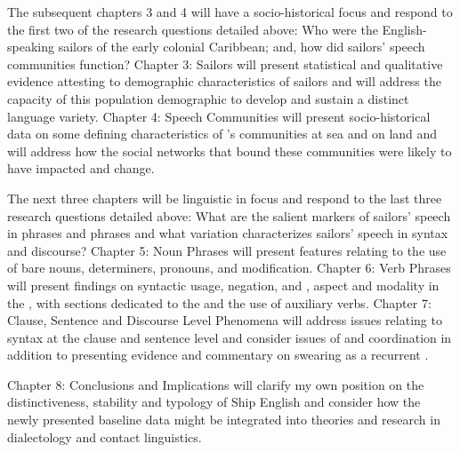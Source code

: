   The subsequent chapters 3 and 4 will have a socio-historical focus and respond to the first two of the research questions detailed above: Who were the English-speaking sailors of the early colonial Caribbean; and, how did sailors’ speech communities function? Chapter 3: Sailors will present statistical and qualitative evidence attesting to demographic characteristics of sailors and will address the capacity of this population demographic to develop and sustain a distinct language variety. Chapter 4: Speech Communities will present socio-historical data on some defining characteristics of ’s communities at sea and on land and will address how the social networks that bound these communities were likely to have impacted  and change.  



  The next three chapters will be linguistic in focus and respond to the last three research questions detailed above: What are the salient markers of sailors’ speech in  phrases and  phrases and what variation characterizes sailors’ speech in syntax and discourse? Chapter 5: Noun Phrases will present features relating to the use of bare nouns, determiners, pronouns, and  modification. Chapter 6: Verb Phrases will present findings on syntactic  usage, negation, and , aspect and modality in the , with sections dedicated to the  and the use of auxiliary verbs. Chapter 7: Clause, Sentence and Discourse Level Phenomena will address issues relating to syntax at the clause and sentence level and consider issues of  and coordination in addition to presenting evidence and commentary on swearing as a recurrent .



  Chapter 8: Conclusions and Implications will clarify my own position on the distinctiveness, stability and typology of Ship English and consider how the newly presented baseline data might be integrated into theories and research in dialectology and contact linguistics.


  